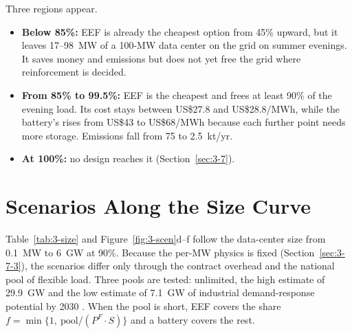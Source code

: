 Three regions appear.
\begin{itemize}
\item \textbf{Below 85\%:} EEF is already the cheapest option from 45\% upward, but it leaves 17--98~MW of a 100-MW data center on the grid on summer evenings. It saves money and emissions but does not yet free the grid where reinforcement is decided.
\item \textbf{From 85\% to 99.5\%:} EEF is the cheapest and frees at least 90\% of the evening load. Its cost stays between US\$27.8 and US\$28.8/MWh, while the battery's rises from US\$43 to US\$68/MWh because each further point needs more storage. Emissions fall from 75 to 2.5~kt/yr.
\item \textbf{At 100\%:} no design reaches it (Section~\ref{sec:3-7}).
\end{itemize}

\section{Scenarios Along the Size Curve}\label{sec:3-10}

Table~\ref{tab:3-size} and Figure~\ref{fig:3-scen}d--f follow the data-center size from 0.1~MW to 6~GW at 90\%. Because the per-MW physics is fixed (Section~\ref{sec:3-7-3}), the scenarios differ only through the contract overhead and the national pool of flexible load. Three pools are tested: unlimited, the high estimate of 29.9~GW and the low estimate of 7.1~GW of industrial demand-response potential by 2030 \cite{r23}. When the pool is short, EEF covers the share $f=\min\{1,\ \text{pool}/(P^F\!\cdot S)\}$ and a battery covers the rest.

